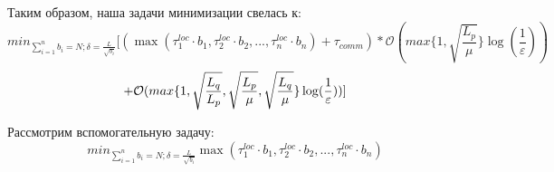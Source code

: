 \documentclass{article}
\begin{document}
Таким образом, наша задачи минимизации свелась к:
\begin{equation}
    \label{eq:5}
    min_{\sum\limits_{i = 1}^{n} b_i = N; \delta = \frac{L}{\sqrt{b_i}}}[(\max(\tau_1^{loc}\cdot b_1, \tau_2^{loc}\cdot b_2, ..., \tau_n^{loc}\cdot b_n) + \tau_{comm}) * \mathcal O(max\{1, \sqrt{\frac{L_p}{\mu}}\}\log(\frac{1}{\varepsilon})) 
\end{equation}
\begin{equation}
     \notag
     +
    \mathcal O(max\{1,\sqrt{\frac{L_q}{L_p}}, \sqrt{\frac{L_p}{\mu}}, \sqrt{\frac{L_q}{\mu}}\}\log(\frac{1}{\varepsilon}))]  
\end{equation}

Рассмотрим вспомогательную задачу:
\begin{equation}
    \label{eq:6}
    min_{\sum\limits_{i = 1}^{n} b_i = N; \delta = \frac{L}{\sqrt{b_i}}} \max(\tau_1^{loc}\cdot b_1, \tau_2^{loc}\cdot b_2, ..., \tau_n^{loc}\cdot b_n)
\end{equation}
\end{document}
